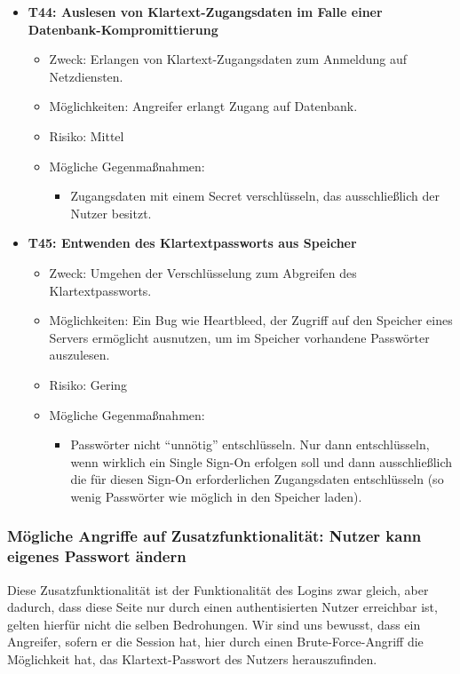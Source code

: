 \documentclass[12pt,DIV14,BCOR10mm,a4paper,parskip=half-,headsepline,headinclude,english,ngerman,bibliography=totocnumbered]{scrreprt}
\begin{document}
\begin{itemize}
  \hypertarget{threat44}{}
  \item \textbf{T44: Auslesen von Klartext-Zugangsdaten im Falle einer Datenbank-Kompromittierung}
  \begin{itemize}
    \item Zweck: Erlangen von Klartext-Zugangsdaten zum Anmeldung auf Netzdiensten.
    \item Möglichkeiten: Angreifer erlangt Zugang auf Datenbank.
    \item Risiko: Mittel
    \item Mögliche Gegenmaßnahmen:
      \begin{itemize}
      	\item Zugangsdaten mit einem Secret verschlüsseln, das ausschließlich der Nutzer besitzt.
      \end{itemize}
  \end{itemize}
    
  \hypertarget{threat45}{}
  \item \textbf{T45: Entwenden des Klartextpassworts aus Speicher}
  \begin{itemize}
    \item Zweck: Umgehen der Verschlüsselung zum Abgreifen des Klartextpassworts.
    \item Möglichkeiten: Ein Bug wie Heartbleed, der Zugriff auf den Speicher eines Servers ermöglicht ausnutzen, um im Speicher vorhandene Passwörter auszulesen.
    \item Risiko: Gering
    \item Mögliche Gegenmaßnahmen:
      \begin{itemize}
      \item Passwörter nicht \enquote{unnötig} entschlüsseln. Nur dann entschlüsseln, wenn wirklich ein Single Sign-On erfolgen soll und dann ausschließlich die für diesen Sign-On erforderlichen Zugangsdaten entschlüsseln (so wenig Passwörter wie möglich in den Speicher laden).
      \end{itemize}
  \end{itemize}

\end{itemize}



\subsubsection{Mögliche Angriffe auf Zusatzfunktionalität: Nutzer kann eigenes Passwort ändern}

Diese Zusatzfunktionalität ist der Funktionalität des Logins zwar gleich, aber dadurch, dass diese Seite nur durch einen authentisierten Nutzer erreichbar ist, gelten hierfür nicht die selben Bedrohungen.
Wir sind uns bewusst, dass ein Angreifer, sofern er die Session hat, hier durch einen Brute-Force-Angriff die Möglichkeit hat, das Klartext-Passwort des Nutzers herauszufinden.
\end{document}
